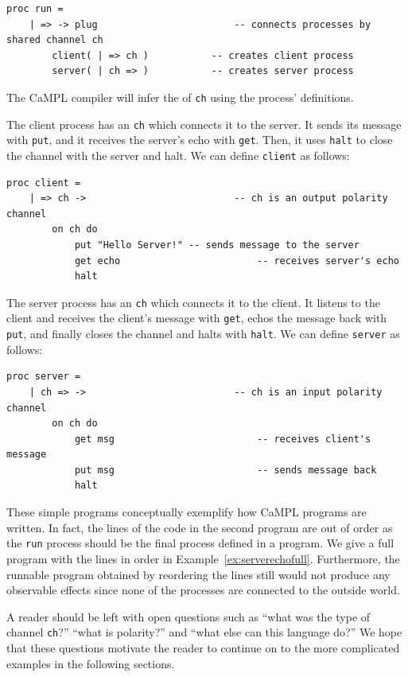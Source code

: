\documentclass[11pt]{article}
\begin{document}
\begin{lstlisting}[label=ex:serverecho, caption=Server echos Client's message]
 proc run = 
 	| => -> plug						-- connects processes by shared channel ch
 		client( | => ch )			-- creates client process
 		server( | ch => )			-- creates server process
\end{lstlisting}
The CaMPL compiler will infer the  of \lstinline$ch$ using the process' definitions. 

The client process has an  \lstinline$ch$ which connects it to the server.
It sends its message with \lstinline$put$, and it receives the server's echo with \lstinline$get$.
Then, it uses \lstinline$halt$ to close the channel with the server and halt.
We can define \lstinline$client$ as follows:
\begin{lstlisting}
proc client = 
	| => ch ->							-- ch is an output polarity channel
		on ch do 
			put "Hello Server!"	-- sends message to the server      
			get echo						-- receives server's echo  
			halt
\end{lstlisting}

The server process has an  \lstinline$ch$ which connects it to the client.
It listens to the client and receives the client's message with \lstinline$get$, echos the message back with \lstinline$put$, and finally closes the channel and halts with \lstinline$halt$.
We can define \lstinline$server$ as follows:
\begin{lstlisting}
proc server =  
	| ch => ->							-- ch is an input polarity channel
		on ch do
			get msg							-- receives client's message
			put msg							-- sends message back
			halt
\end{lstlisting}	

These simple programs conceptually exemplify how CaMPL programs are written.
In fact, the lines of the code in the second program are out of order as the \lstinline$run$ process should be the final process defined in a program.
We give a full program with the lines in order in Example~\ref{ex:serverechofull}.
Furthermore, the runnable program obtained by reordering the lines still would not produce any observable effects since none of the processes are connected to the outside world.

A reader should be left with open questions such as ``what was the type of channel \lstinline$ch$?'' ``what is polarity?'' and ``what else can this language do?''
We hope that these questions motivate the reader to continue on to the more complicated examples in the following sections.
\end{document}
